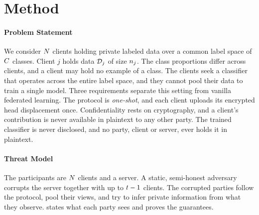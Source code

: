 %
%

\section{Method}
\label{sec:method}
\label{sec:setting}

\paragraph{Problem Statement} We consider $N$ clients holding private labeled
data over a common label space of $C$ classes. Client $j$ holds data $\mathcal{D}_j$ of
size $n_j$. The class proportions differ across clients, and a client may hold no
example of a class. The clients seek a classifier that operates across the entire
label space, and they cannot pool their data to train a single model. Three
requirements separate this setting from vanilla federated learning. The protocol
is \emph{one-shot}, and each client uploads its encrypted head displacement once.
Confidentiality rests on cryptography, and a client's contribution is never
available in plaintext to any other party. The trained classifier is never
disclosed, and no party, client or server, ever holds it in plaintext.

\paragraph{Threat Model} The participants are $N$ clients and a server. A
static, semi-honest adversary corrupts the server together with up to $t-1$
clients. The corrupted parties follow the protocol, pool their views, and try to
infer private information from what they observe.  states what
each party sees and proves the guarantees.

